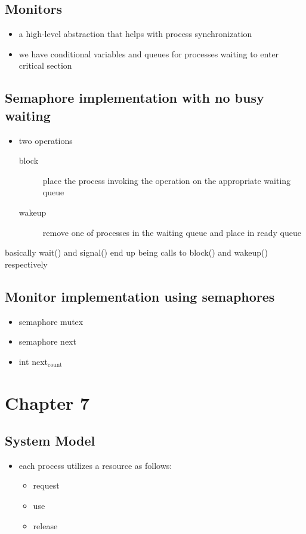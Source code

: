 \documentclass[11pt]{article}
\begin{document}
\subsection{Monitors}
\label{sec:org0c8db90}
\begin{itemize}
\item a high-level abstraction that helps with process synchronization
\item we have conditional variables and queues for processes waiting to enter critical section
\end{itemize}
\subsection{Semaphore implementation with no busy waiting}
\label{sec:org92b72f5}
\begin{itemize}
\item two operations
\begin{description}
\item[{block}] place the process invoking the operation on the appropriate waiting queue
\item[{wakeup}] remove one of processes in the waiting queue and place in ready queue
\end{description}
\end{itemize}
basically wait() and signal() end up being calls to block() and wakeup() respectively
\subsection{Monitor implementation using semaphores}
\label{sec:org0b0fa3a}
\begin{itemize}
\item semaphore mutex
\item semaphore next
\item int next\(_{\text{count}}\)
\end{itemize}
\section{Chapter 7}
\label{sec:org9106cc1}
\subsection{System Model}
\label{sec:orgaae62eb}
\begin{itemize}
\item each process utilizes a resource as follows:
\begin{itemize}
\item request
\item use
\item release
\end{itemize}
\end{itemize}
\end{document}
